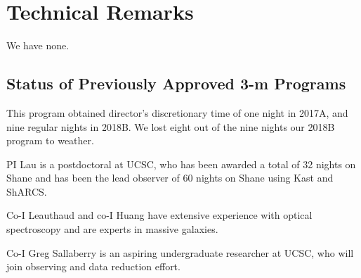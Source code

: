 \documentclass[letterpaper,12pt]{article}
\begin{document}
\section{Technical Remarks}

We have none. 

\subsection{Status of Previously Approved 3-m Programs}

This program obtained director's discretionary time of one night in 2017A, and nine regular 
nights in 2018B. We lost eight out of the nine nights our 2018B program to weather. 

PI Lau is a postdoctoral at UCSC, who has been awarded a total of 32 nights on Shane and has 
been the lead observer of 60 nights on Shane using Kast and ShARCS. 

Co-I Leauthaud and co-I Huang have extensive experience with optical spectroscopy and are experts 
in massive galaxies. 

Co-I Greg Sallaberry is an aspiring undergraduate researcher at UCSC, who will join observing 
and data reduction effort. 
\end{document}
